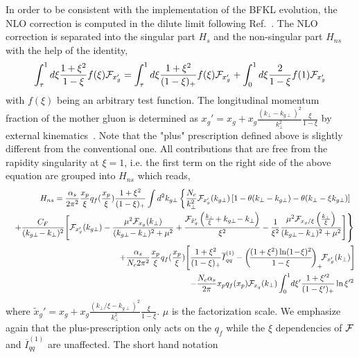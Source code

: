 \documentclass[prd,aps,preprint,tightenlines,nofootinbib,superscriptaddress]{revtex4}
\begin{document}
In order to be consistent with the implementation of the BFKL evolution, the NLO correction is  computed in the dilute limit following Ref.~\cite{Watanabe:2016gws}.  The NLO correction is separated into the singular part  $H_s$ and the non-singular part $H_{ns}$ with the help of the identity,
\begin{align}
    \int_\tau^1d\xi\frac{1+\xi^2}{1-\xi}f(\xi){\cal F}_{x_g'}=\int_\tau^1d\xi\frac{1+\xi^2}{(1-\xi)_+}f(\xi){\cal F}_{x_g'}+\int_0^1d\xi\frac{2}{1-\xi}f(1){\cal F}_{x_g'}
    \label{eq:plus-function}
    \end{align}
with  $f(\xi)$ being an arbitrary test function.  The longitudinal momentum fraction of the mother gluon is determined as $x_g'=x_g+x_g\frac{(k_\perp-k_{g\perp})^2}{k_\perp^2}\frac{\xi}{1-\xi}$ by external kinematics~\cite{Iancu:2016vyg}. Note that the "plus" prescription defined above is slightly different from the conventional one.    All contributions that are free from the rapidity  singularity at $\xi=1$, i.e. the first term on the right side of the above equation are grouped into $H_{ns}$ which reads,
\begin{eqnarray}
 && \!\!\!\!\! H_{ns}=\frac{\alpha_s}{2\pi^2}\frac{ x_p}{\xi} q_f(\frac{x_p}{\xi})\frac{1+\xi^2}{(1-\xi)_+}  \int d^2 k_{g\perp}  \left \{ \frac{ N_c}{k_{\perp}^2} {\cal F}_{x_g'}(k_{g\perp})\left[1  -\theta(k_\perp-k_{g\perp} ) -\theta(k_\perp-\xi k_{g\perp})  \right] \right .\ \nonumber \\ &&  \left .\ \!\!+  \frac{C_F }{(k_{g\perp}\!-k_\perp)^2}
  \Bigg[ {\cal F}_{x_g'}(k_{g\perp})-\frac{\mu^2 {\cal F}_{x_g}(k_\perp)}{(k_{g\perp}\!-k_\perp)^2+\mu^2} 
  +\frac{{\cal F}_{\tilde x_g'}\left(\frac{k_\perp}{\xi}\!+k_{g\perp}\!-k_\perp\right) }{\xi^2}-\frac{1}{\xi^2}\frac{\mu^2 {\cal F}_{x_g/\xi}\left(\frac{k_\perp}{\xi}\right)}{(k_{g\perp}\!-k_\perp)^2+\mu^2}  \Bigg]  \right \} \nonumber \\
  &&  
  +\frac{\alpha_s}{N_c2\pi^2}\frac{ x_p}{\xi} q_f(\frac{x_p}{\xi})\! \left[\frac{1+\xi^2}{(1-\xi)_+}\overline{I}^{(1)}_{qq}-\left(\!\frac{(1+\xi^2)\ln(1\!-\!\xi)^2}{1-\xi}\!\right)_+\!\! {\cal F}_{x_g'}(k_\perp)\right]\!\nonumber \\&&
  - \frac{N_c\alpha_s}{2\pi} x_p q_f(x_p){\cal F}_{x_g}(k_\perp)\int_0^1 \! d\xi^\prime\frac{1+\xi^{\prime2}}{(1-\xi^\prime)_+}\ln \xi^{\prime2}
  \end{eqnarray}
 where   $\tilde x_g'=x_g+x_g\frac{(k_\perp/\xi- k_{g\perp})^2}{k_\perp^2}\frac{\xi}{1-\xi}$.    $\mu$ is the factorization scale. We emphasize again that  the plus-prescription only acts on the $q_f$ while the $\xi$ dependencies of ${\cal F}$ and $\overline{I}^{(1)}_{qq}$ are unaffected.   The short hand notation
\end{document}
